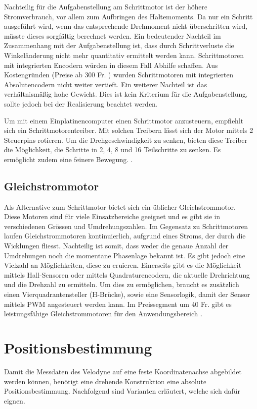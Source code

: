 Nachteilig für die Aufgabenstellung am Schrittmotor ist der höhere Stromverbrauch, vor allem zum Aufbringen des Haltemoments. Da nur ein Schritt ausgeführt wird, wenn das entsprechende Drehmoment nicht überschritten wird, müsste dieses sorgfältig berechnet werden. Ein bedeutender Nachteil im Zusammenhang mit der Aufgabenstellung ist, dass durch Schrittverluste die Winkeländerung nicht mehr quantitativ ermittelt werden kann. Schrittmotoren mit integrierten Encodern würden in diesem Fall Abhilfe schaffen. Aus Kostengründen (Preise ab 300 Fr. \cite{mouserstepper}) wurden Schrittmotoren mit integrierten Absolutencodern nicht weiter vertieft. 
Ein weiterer Nachteil ist das verhältnismäßig hohe Gewicht. Dies ist kein Kriterium für die Aufgabenstellung, sollte jedoch bei der Realisierung beachtet werden.

Um mit einem Einplatinencomputer einen Schrittmotor anzusteuern, empfiehlt sich ein Schrittmotorentreiber. Mit solchen Treibern lässt sich der Motor mittels 2 Steuerpins rotieren. Um die Drehgeschwindigkeit zu senken, bieten diese Treiber die Möglichkeit, die Schritte in 2, 4, 8 und 16 Teilschritte zu senken. Es ermöglicht zudem eine feinere Bewegung. \cite{DRV8825}.

\subsection{Gleichstrommotor}
\label{subsec:Gleichstrommotor}
Als Alternative zum Schrittmotor bietet sich ein üblicher Gleichstrommotor. Diese Motoren sind für viele Einsatzbereiche geeignet und es gibt sie in verschiedenen Grössen und Umdrehungszahlen. Im Gegensatz zu Schrittmotoren laufen Gleichstrommotoren kontinuierlich, aufgrund eines Stroms, der durch die Wicklungen fliesst. Nachteilig ist somit, dass weder die genaue Anzahl der Umdrehungen noch die momentane Phasenlage bekannt ist. Es gibt jedoch eine Vielzahl an Möglichkeiten, diese zu eruieren. Einerseits gibt es die Möglichkeit mittels Hall-Sensoren oder mittels Quadraturencodern, die aktuelle Drehrichtung und die Drehzahl zu ermitteln. Um dies zu ermöglichen, braucht es zusätzlich einen Vierquadrantensteller (H-Brücke), sowie eine Sensorlogik, damit der Sensor mittels \ac{PWM} angesteuert werden kann. Im Preissegment um 40 Fr. gibt es leistungsfähige Gleichstrommotoren für den Anwendungsbereich \cite{pololumotor}.

\section{Positionsbestimmung}
\label{sec:position}
Damit die Messdaten des Velodyne auf eine feste Koordinatenachse abgebildet werden können, benötigt eine drehende Konstruktion eine absolute Positionsbestimmung. Nachfolgend sind Varianten erläutert, welche sich dafür eignen.

